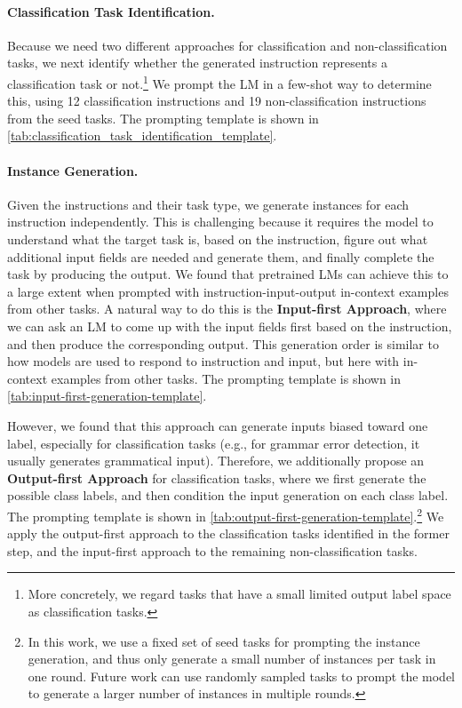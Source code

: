 \paragraph{Classification Task Identification.} Because we need two different approaches for classification and non-classification tasks, we next identify whether the generated instruction represents a classification task or not.\footnote{More concretely, we regard tasks that have a small limited output label space as classification tasks.} We prompt the LM in a few-shot way to determine this, using 12 classification instructions and 19 non-classification instructions from the seed tasks. The prompting template is shown in \autoref{tab:classification_task_identification_template}. 

\paragraph{Instance Generation.} Given the instructions and their task type, we generate instances for each instruction independently. This is challenging because it requires the model to understand what the target task is, based on the instruction, figure out what additional input fields are needed and generate them, and finally complete the task by producing the output. We found that pretrained LMs can achieve this to a large extent when prompted with instruction-input-output in-context examples from other tasks. A natural way to do this is the \textbf{Input-first Approach}, where we can ask an LM to come up with the input fields first based on the instruction, and then produce the corresponding output. This generation order is similar to how models are used to respond to instruction and input, but here with in-context examples from other tasks. The prompting template is shown in \autoref{tab:input-first-generation-template}. 

However, we found that this approach can generate inputs biased toward one label, especially for classification tasks (e.g., for grammar error detection, it usually generates grammatical input). Therefore, we additionally propose an
\textbf{Output-first Approach} for classification tasks, where we first generate the possible class labels, and then condition the input generation on each class label. The prompting template is shown in \autoref{tab:output-first-generation-template}.\footnote{In this work, we use a fixed set of seed tasks for prompting the instance generation, and thus only generate a small number of instances per task in one round. Future work can use randomly sampled tasks to prompt the model to generate a larger number of instances in multiple rounds.} We apply the output-first approach to the classification tasks identified in the former step, and the input-first approach to the remaining non-classification tasks.


